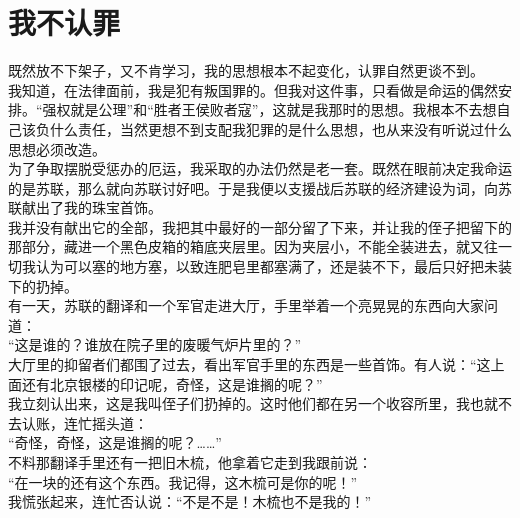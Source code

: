 \fancyhead[RO]{} %
\fancyhead[LE]{} %
\chapter*{我不认罪}
\thispagestyle{empty}
既然放不下架子，又不肯学习，我的思想根本不起变化，认罪自然更谈不到。\\

我知道，在法律面前，我是犯有叛国罪的。但我对这件事，只看做是命运的偶然安排。“强权就是公理”和“胜者王侯败者寇”，这就是我那时的思想。我根本不去想自己该负什么责任，当然更想不到支配我犯罪的是什么思想，也从来没有听说过什么思想必须改造。\\

为了争取摆脱受惩办的厄运，我采取的办法仍然是老一套。既然在眼前决定我命运的是苏联，那么就向苏联讨好吧。于是我便以支援战后苏联的经济建设为词，向苏联献出了我的珠宝首饰。\\

我并没有献出它的全部，我把其中最好的一部分留了下来，并让我的侄子把留下的那部分，藏进一个黑色皮箱的箱底夹层里。因为夹层小，不能全装进去，就又往一切我认为可以塞的地方塞，以致连肥皂里都塞满了，还是装不下，最后只好把未装下的扔掉。\\

有一天，苏联的翻译和一个军官走进大厅，手里举着一个亮晃晃的东西向大家问道：\\

“这是谁的？谁放在院子里的废暖气炉片里的？”\\

大厅里的抑留者们都围了过去，看出军官手里的东西是一些首饰。有人说：“这上面还有北京银楼的印记呢，奇怪，这是谁搁的呢？”\\

我立刻认出来，这是我叫侄子们扔掉的。这时他们都在另一个收容所里，我也就不去认账，连忙摇头道：\\

“奇怪，奇怪，这是谁搁的呢？……”\\

不料那翻译手里还有一把旧木梳，他拿着它走到我跟前说：\\

“在一块的还有这个东西。我记得，这木梳可是你的呢！”\\

我慌张起来，连忙否认说：“不是不是！木梳也不是我的！”\\

